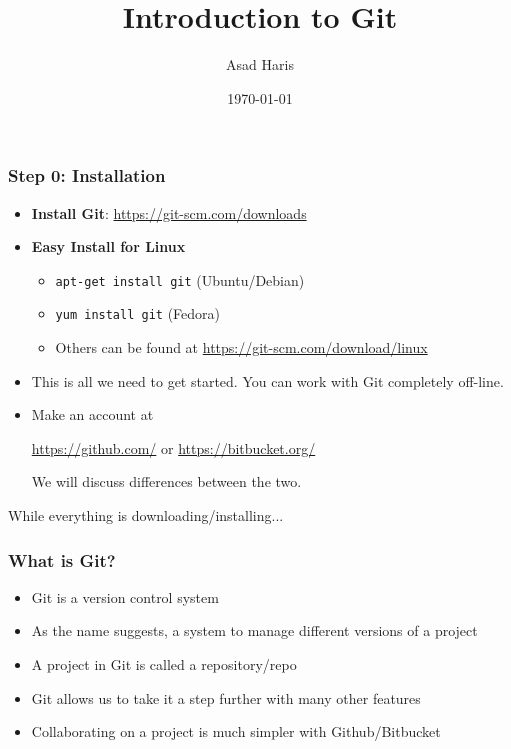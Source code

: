 \documentclass{beamer}
\title[\texttt{Intro to Git}]{Introduction to Git}
\author[Asad Haris]{Asad Haris}
\institute[Dept of Biostatistics]
{Department of Biostatistics \\
University of Washington\\
\medskip
}
\date{\today}
\begin{document}
\begin{frame}
\titlepage
\end{frame}

\begin{frame}
\frametitle{Step 0: Installation}
\begin{itemize}
\item \textbf{Install Git}: \url{https://git-scm.com/downloads}
\item \textbf{Easy Install for Linux}
\begin{itemize}
\item \texttt{apt-get install git} (Ubuntu/Debian)
\item \texttt{yum install git} (Fedora)
\item Others can be found at \url{https://git-scm.com/download/linux}
\end{itemize}

\item This is all we need to get started. You can work with Git completely off-line. 

\pause
\item Make an account at 

\url{https://github.com/} or \url{https://bitbucket.org/} 

We will discuss differences between the two. 
\end{itemize}



\end{frame}


\begin{frame}
\centering
\Large While everything is downloading/installing... 
\end{frame}

\begin{frame}
\frametitle{What is Git?}
\begin{itemize}
\item Git is a version control system
\item As the name suggests, a system to manage different versions of a project
\item A project in Git is called a repository/repo 
\item Git allows us to take it a step further with many other features
\item Collaborating on a project is much simpler with Github/Bitbucket
\end{itemize}
\end{frame}
\end{document}
